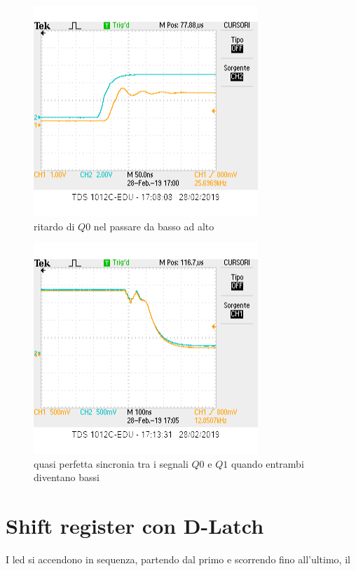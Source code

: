 \documentclass[10pt,a4paper]{article}
\begin{document}
\begin{figure}[h]
			\centering
			\includegraphics[scale=0.85]{tcounter_1}
			\caption{ritardo di $Q0$ nel passare da basso ad alto}
			\label{fig:t2}
\end{figure}

\begin{figure}[h]
			\centering
			\includegraphics[scale=0.85]{Q0Q1sincroni}
			\caption{quasi perfetta sincronia tra i segnali $Q0$ e $Q1$ quando entrambi diventano bassi}
			\label{fig:q0q1}
\end{figure}
\section{Shift register con D-Latch}
I led si accendono in sequenza, partendo dal primo e scorrendo fino all'ultimo, il
\end{document}
